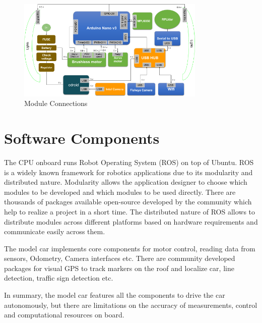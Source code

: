 \begin{figure}
	\centering
	\includegraphics[width=0.8\textwidth]{Images/platform/hardware_Connections.png}
	\caption{Module Connections}
	\label{moduleconnections}
\end{figure}

\section{Software Components}
The CPU onboard runs Robot Operating System (ROS) on top of Ubuntu. ROS is a widely known framework for robotics applications due to its modularity and distributed nature. Modularity allows the application designer to choose which modules to be developed and which modules to be used directly. There are thousands of packages available open-source developed by the community which help to realize a project in a short time. The distributed nature of ROS allows to distribute modules across different platforms based on hardware requirements and communicate easily across them.

The model car implements core components for motor control, reading data from sensors, Odometry, Camera interfaces etc. There are community developed packages for visual GPS to track markers on the roof and localize car, line detection, traffic sign detection etc.

In summary, the model car features all the components to drive the car autonomously, but there are limitations on the accuracy of measurements, control and computational resources on board. 


